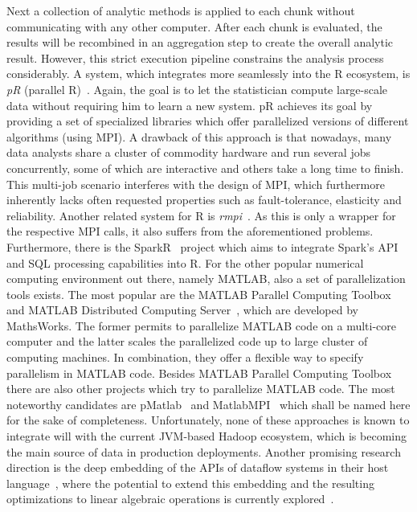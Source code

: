 Next a collection of analytic methods is applied to each chunk without communicating with any other computer. After each chunk is evaluated, the results will be recombined in an aggregation step to create the overall analytic result. However, this strict execution pipeline constrains the analysis process considerably. A system, which integrates more seamlessly into the R ecosystem, is {\em pR} (parallel R)~\cite{samatova:2009a}. Again, the goal is to let the statistician compute large-scale data without requiring him to learn a new system. pR achieves its goal by providing a set of specialized libraries which offer parallelized versions of different algorithms (using MPI). A drawback of this approach is that nowadays, many data analysts share a cluster of commodity hardware and run several jobs concurrently, some of which are interactive and others take a long time to finish. This multi-job scenario interferes with the design of MPI, which furthermore inherently lacks often requested properties such as fault-tolerance, elasticity and reliability. Another related system for R is {\em rmpi}~\cite{rmpi}. As this is only a wrapper for the respective MPI calls, it also suffers from the aforementioned problems. Furthermore, there is the SparkR~\cite{Venkataraman2016} project which aims to integrate Spark's API and SQL processing capabilities into R. For the other popular numerical computing environment out there, namely MATLAB, also a set of parallelization tools exists. The most popular are the MATLAB Parallel Computing Toolbox~\cite{parallelComputingToolbox} and MATLAB Distributed Computing Server~\cite{distributedComputingServer}, which are developed by MathsWorks. The former permits to parallelize MATLAB code on a multi-core computer and the latter scales the parallelized code up to large cluster of computing machines. In combination, they offer a flexible way to specify parallelism in MATLAB code. Besides MATLAB Parallel Computing Toolbox there are also other projects which try to parallelize MATLAB code. The most noteworthy candidates are pMatlab~\cite{bliss:ijhpca2007a} and MatlabMPI~\cite{kepner:jpdc2004a} which shall be named here for the sake of completeness. Unfortunately, none of these approaches is known to integrate will with the current JVM-based Hadoop ecosystem, which is becoming the main source of data in production deployments. Another promising research direction is the deep embedding of the APIs of dataflow systems in their host language~\cite{Alexandrov2015}, where the potential to extend this embedding and the resulting optimizations to linear algebraic operations is currently explored~\cite{Kunft2016}.